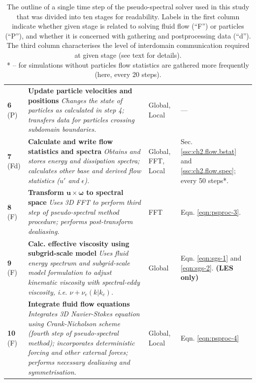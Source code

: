 \documentclass{pracamgren}
\begin{document}
\begin{table}[!htbp]
\begin{tabular}{p{10mm}p{75mm}p{25mm}p{27mm}}
\rowcolor[RGB]{240,220,190} \textbf{6} \newline (P) &
\textbf{Update particle velocities and positions} \newline \emph{Changes the state of particles as calculated in step 4; transfers data for particles crossing subdomain boundaries.} & Global, Local & --- \\ 
\rowcolor[RGB]{150,240,150} \textbf{7} \newline (Fd) &
\textbf{Calculate and write flow statistics and spectra} \newline \emph{Obtains and stores energy and dissipation spectra; calculates other base and derived flow statistics ($u'$ and $\epsilon$).} & Global, FFT, Local & Sec. \ref{ssc:ch2.flow.bstat} and \ref{ssc:ch2.flow.spec}; \newline every 50 steps*. \\ 
\rowcolor[RGB]{190,240,220} \textbf{8} \newline (F) & 
\textbf{Transform $\mathbf{u} \times \boldsymbol{\omega}$ to spectral space} \newline \emph{Uses 3D FFT to perform third step of pseudo-spectral method procedure; performs post-transform dealiasing.} & FFT & Eqn. \ref{eqn:psproc-3}. \\
\rowcolor[RGB]{150,190,240} \textbf{9} \newline (F) & 
\textbf{Calc. effective viscosity using subgrid-scale model} \newline \emph{Uses fluid energy spectrum and subgrid-scale model formulation to adjust kinematic viscosity with spectral-eddy viscosity, i.e. $\nu + \nu_e(k|k_c)$.} & Global & Eqn. \ref{eqn:sgs-1} and \ref{eqn:sgs-2}. \newline \textbf{(LES only)} \\ 
\rowcolor[RGB]{190,240,220} \textbf{10} \newline (F) &
\textbf{Integrate fluid flow equations} \newline \emph{Integrates 3D Navier-Stokes equation using Crank-Nicholson scheme (fourth step of pseudo-spectral method); incorporates deterministic forcing and other external forces; performs necessary dealiasing and symmetrisation.} & Global, Local & Eqn. \ref{eqn:psproc-4} \\ \hline \hline
\end{tabular}
\caption{
The outline of a single time step of the pseudo-spectral solver used in this study that was divided into ten stages for readability.
Labels in the first column indicate whether given stage is related to solving fluid flow (``F'') or particles (``P''), and whether it is concerned with gathering and postprocessing data (``d'').
The third column characterises the level of interdomain communication required at given stage (see text for details). \\
* -- for simulations without particles flow statistics are gathered more frequently (here, every 20 steps).
}
\label{tab:code-steps}
\end{table}
\end{document}
